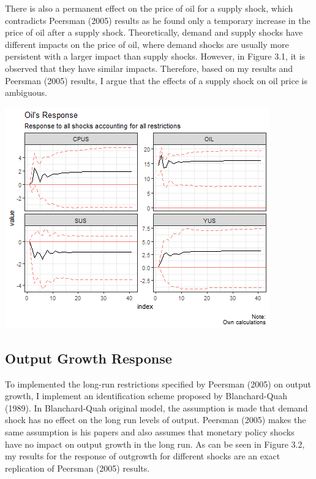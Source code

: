 \documentclass[11pt,preprint, authoryear]{elsarticle}
\let\origfigure\figure
\let\endorigfigure\endfigure
\renewenvironment{figure}[1][2] {
    \expandafter\origfigure\expandafter[H]
} {
    \endorigfigure
}
\numberwithin{equation}{section}
\numberwithin{figure}{section}
\numberwithin{table}{section}
\begin{document}
There is also a permanent effect on the price of oil for a supply shock,
which contradicts Peersman (2005) results as he found only a temporary
increase in the price of oil after a supply shock. Theoretically, demand
and supply shocks have different impacts on the price of oil, where
demand shocks are usually more persistent with a larger impact than
supply shocks. However, in Figure 3.1, it is observed that they have
similar impacts. Therefore, based on my results and Peersman (2005)
results, I argue that the effects of a supply shock on oil price is
ambiguous.

\begin{figure}[H]

{\centering \includegraphics{replication_files/figure-latex/Figure2-1} 

}

\caption{Response of Oil Price\label{Figure2}}\label{fig:Figure2}
\end{figure}

\hypertarget{output-growth-response}{%
\subsection{Output Growth Response}\label{output-growth-response}}

To implemented the long-run restrictions specified by Peersman (2005) on
output growth, I implement an identification scheme proposed by
Blanchard-Quah (1989). In Blanchard-Quah original model, the assumption
is made that demand shock has no effect on the long run levels of
output. Peersman (2005) makes the same assumption is his papers and also
assumes that monetary policy shocks have no impact on output growth in
the long run. As can be seen in Figure 3.2, my results for the response
of outgrowth for different shocks are an exact replication of Peersman
(2005) results.
\end{document}
